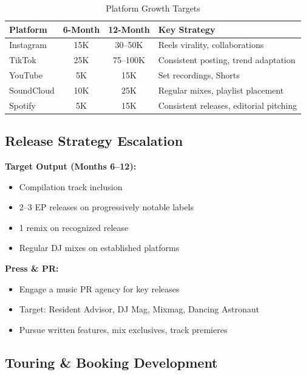 \documentclass[11pt,a4paper]{article}
\begin{document}
\begin{table}[h!]
\centering
\renewcommand{\arraystretch}{1.3}
\begin{tabularx}{\textwidth}{l c c X}
\toprule
\rowcolor{amaraprimary}
\textcolor{amaracream}{\textbf{Platform}} & \textcolor{amaracream}{\textbf{6-Month}} & \textcolor{amaracream}{\textbf{12-Month}} & \textcolor{amaracream}{\textbf{Key Strategy}} \\
\midrule
Instagram & 15K & 30--50K & Reels virality, collaborations \\
TikTok & 25K & 75--100K & Consistent posting, trend adaptation \\
YouTube & 5K & 15K & Set recordings, Shorts \\
SoundCloud & 10K & 25K & Regular mixes, playlist placement \\
Spotify & 5K & 15K & Consistent releases, editorial pitching \\
\bottomrule
\end{tabularx}
\caption{Platform Growth Targets}
\end{table}

\subsection{Release Strategy Escalation}

\noindent\textbf{Target Output (Months 6--12):}
\begin{itemize}[leftmargin=*]
    \item Compilation track inclusion
    \item 2--3 EP releases on progressively notable labels
    \item 1 remix on recognized release
    \item Regular DJ mixes on established platforms
\end{itemize}

\noindent\textbf{Press \& PR:}
\begin{itemize}[leftmargin=*]
    \item Engage a music PR agency for key releases
    \item Target: Resident Advisor, DJ Mag, Mixmag, Dancing Astronaut
    \item Pursue written features, mix exclusives, track premieres
\end{itemize}

\subsection{Touring \& Booking Development}
\end{document}
